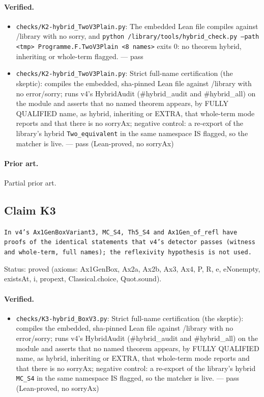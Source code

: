 \documentclass{article}
\begin{document}
\paragraph{Verified.}
\begin{itemize}
\item \texttt{checks/K2-hybrid\_TwoV3Plain.py}: The embedded Lean file compiles against /library with no sorry, and \texttt{python /library/tools/hybrid\_check.py --path \textless{}tmp\textgreater{} Programme.F.TwoV3Plain \textless{}8 names\textgreater{}} exits 0: no theorem hybrid, inheriting or whole-term flagged. --- pass
\item \texttt{checks/K2-hybrid\_TwoV3Plain.py}: Strict full-name certification (the skeptic): compiles the embedded, sha-pinned Lean file against /library with no error/sorry; runs v4's HybridAudit (\#hybrid\_audit and \#hybrid\_all) on the module and asserts that no named theorem appears, by FULLY QUALIFIED name, as hybrid, inheriting or EXTRA, that whole-term mode reports and that there is no sorryAx; negative control: a re-export of the library's hybrid \texttt{Two\_equivalent} in the same namespace IS flagged, so the matcher is live. --- pass (Lean-proved, no sorryAx)
\end{itemize}

\paragraph{Prior art.} Partial prior art.

\subsection*{Claim K3}

\texttt{In v4's Ax1GenBoxVariant3, MC\_S4, Th5\_S4 and Ax1Gen\_of\_refl have proofs of the identical statements that v4's detector passes (witness and whole-term, full names); the reflexivity hypothesis is not used.}

Status: proved (axioms: Ax1GenBox, Ax2a, Ax2b, Ax3, Ax4, P, R, e, eNonempty, existsAt, i, propext, Classical.choice, Quot.sound).

\paragraph{Verified.}
\begin{itemize}
\item \texttt{checks/K3-hybrid\_BoxV3.py}: Strict full-name certification (the skeptic): compiles the embedded, sha-pinned Lean file against /library with no error/sorry; runs v4's HybridAudit (\#hybrid\_audit and \#hybrid\_all) on the module and asserts that no named theorem appears, by FULLY QUALIFIED name, as hybrid, inheriting or EXTRA, that whole-term mode reports and that there is no sorryAx; negative control: a re-export of the library's hybrid \texttt{MC\_S4} in the same namespace IS flagged, so the matcher is live. --- pass (Lean-proved, no sorryAx)
\end{itemize}
\end{document}
